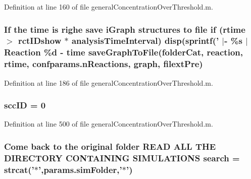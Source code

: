 Definition at line 160 of file general\-Concentration\-Over\-Threshold.\-m.

\hypertarget{a00022_a95b8ff8a27bbc7e771fa2fdd279f2465}{
\subsubsection[{save\-Graph\-To\-File}]{\setlength{\rightskip}{0pt plus 5cm}If the time is {\bf righe} save i\-Graph structures {\bf to} {\bf file} {\bf if} ({\bf rtime} $>$ {\bf rct\-I\-Dshow} $\ast$ analysis\-Time\-Interval) {\bf disp}(sprintf(' $|$-\/ \%s $|$ Reaction \%d -\/ time save\-Graph\-To\-File({\bf folder\-Cat}, {\bf reaction}, {\bf rtime}, {\bf confparams.\-n\-Reactions}, {\bf graph}, {\bf filext\-Pre})}}\label{a00022_a95b8ff8a27bbc7e771fa2fdd279f2465}


Definition at line 186 of file general\-Concentration\-Over\-Threshold.\-m.

\hypertarget{a00022_a85ff953f350ff6660d5f3489e31d57b6}{
\subsubsection[{scc\-I\-D}]{\setlength{\rightskip}{0pt plus 5cm}scc\-I\-D = 0}}\label{a00022_a85ff953f350ff6660d5f3489e31d57b6}


Definition at line 500 of file general\-Concentration\-Over\-Threshold.\-m.

\hypertarget{a00022_ab3186e0326a3b47b2cfcb5577ab5139f}{
\subsubsection[{search}]{\setlength{\rightskip}{0pt plus 5cm}Come back {\bf to} the original folder R\-E\-A\-D A\-L\-L T\-H\-E D\-I\-R\-E\-C\-T\-O\-R\-Y C\-O\-N\-T\-A\-I\-N\-I\-N\-G S\-I\-M\-U\-L\-A\-T\-I\-O\-N\-S search = strcat('$\ast$',{\bf params.\-sim\-Folder},'$\ast$')}}\label{a00022_ab3186e0326a3b47b2cfcb5577ab5139f}


